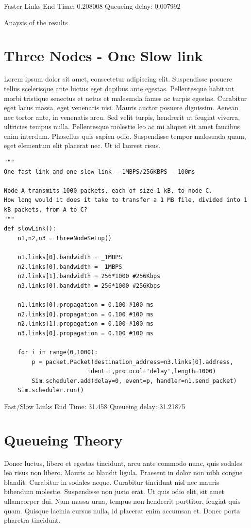 \documentclass[11pt]{article}
\begin{document}
Faster Links
End Time: 0.208008
Queueing delay: 0.007992

Anaysis of the results

\section{Three Nodes - One Slow link}

Lorem ipsum dolor sit amet, consectetur adipiscing elit. Suspendisse
posuere tellus scelerisque ante luctus eget dapibus ante
egestas. Pellentesque habitant morbi tristique senectus et netus et
malesuada fames ac turpis egestas. Curabitur eget lacus massa, eget
venenatis nisi. Mauris auctor posuere dignissim. Aenean nec tortor
ante, in venenatis arcu. Sed velit turpis, hendrerit ut feugiat
viverra, ultricies tempus nulla. Pellentesque molestie leo ac mi
aliquet sit amet faucibus enim interdum. Phasellus quis sapien
odio. Suspendisse tempor malesuada quam, eget elementum elit placerat
nec. Ut id laoreet risus.

\begin{lstlisting}
"""
One fast link and one slow link - 1MBPS/256KBPS - 100ms

Node A transmits 1000 packets, each of size 1 kB, to node C. 
How long would it does it take to transfer a 1 MB file, divided into 1 kB packets, from A to C?
"""
def slowLink():
    n1,n2,n3 = threeNodeSetup()

    n1.links[0].bandwidth = _1MBPS
    n2.links[0].bandwidth = _1MBPS
    n2.links[1].bandwidth = 256*1000 #256Kbps
    n3.links[0].bandwidth = 256*1000 #256Kbps

    n1.links[0].propagation = 0.100 #100 ms
    n2.links[0].propagation = 0.100 #100 ms
    n2.links[1].propagation = 0.100 #100 ms
    n3.links[0].propagation = 0.100 #100 ms

    for i in range(0,1000):
        p = packet.Packet(destination_address=n3.links[0].address,
                        ident=i,protocol='delay',length=1000)
        Sim.scheduler.add(delay=0, event=p, handler=n1.send_packet)
    Sim.scheduler.run()
\end{lstlisting}
Fast/Slow Links
End Time: 31.458
Queueing delay: 31.21875

\section{Queueing Theory}

Donec luctus, libero et egestas tincidunt, arcu ante commodo nunc,
quis sodales leo risus non libero. Mauris ac blandit ligula. Praesent
in dolor non nibh congue blandit. Curabitur in sodales
neque. Curabitur tincidunt nisl nec mauris bibendum
molestie. Suspendisse non justo erat. Ut quis odio elit, sit amet
ullamcorper dui. Nam massa urna, tempus non hendrerit porttitor,
feugiat quis quam. Quisque lacinia cursus nulla, id placerat enim
accumsan et. Donec porta pharetra tincidunt.
\end{document}
